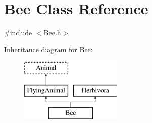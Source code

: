 \hypertarget{classBee}{\section{Bee Class Reference}
\label{classBee}
}


{\ttfamily \#include $<$Bee.\-h$>$}

Inheritance diagram for Bee\-:\begin{figure}[H]
\begin{center}
\leavevmode
\includegraphics[height=3.000000cm]{classBee}
\end{center}
\end{figure}
